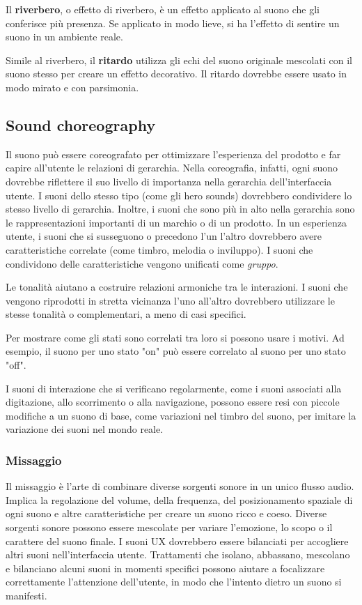 \documentclass[12pt, a4paper]{report}
\begin{document}
                    	Il \textbf{riverbero}, o effetto di riverbero, è un effetto applicato al suono che gli conferisce più presenza. Se applicato in modo lieve, si ha l'effetto di sentire un suono in un ambiente reale.


                    	Simile al riverbero, il \textbf{ritardo} utilizza gli echi del suono originale mescolati con il suono stesso per creare un effetto decorativo. Il ritardo dovrebbe essere usato in modo mirato e con parsimonia.


                \subsection{Sound choreography}
                Il suono può essere coreografato per ottimizzare l'esperienza del prodotto  e far capire all'utente le relazioni  di gerarchia. Nella coreografia, infatti, ogni suono dovrebbe riflettere il suo livello di
                importanza nella gerarchia dell'interfaccia utente. I suoni dello stesso tipo (come gli hero sounds) dovrebbero condividere lo stesso livello di gerarchia. Inoltre, i suoni che sono più in alto nella
                gerarchia sono le rappresentazioni importanti di un marchio o di un prodotto. In un esperienza utente, i suoni che si susseguono o precedono l'un l'altro dovrebbero avere caratteristiche correlate
                (come timbro, melodia o inviluppo). I suoni che condividono delle caratteristiche vengono unificati come \textit{gruppo}.

                Le tonalità aiutano a costruire relazioni armoniche tra le interazioni. I suoni che vengono riprodotti in stretta vicinanza l'uno all'altro dovrebbero utilizzare le stesse tonalità o complementari, a meno di  casi specifici.

                Per mostrare come gli stati sono correlati tra loro si possono usare i motivi. Ad esempio, il suono per uno stato "on" può essere correlato al suono per uno stato "off".

                I suoni di interazione che si verificano regolarmente, come i suoni associati alla digitazione, allo scorrimento o alla navigazione, possono essere resi con piccole modifiche a un suono di base, come variazioni nel timbro del
                suono, per imitare la variazione dei suoni nel mondo reale.

                \subsubsection{Missaggio}
                Il missaggio è l'arte di combinare diverse sorgenti sonore in un unico flusso audio. Implica la regolazione del volume, della frequenza, del posizionamento spaziale di ogni suono e altre caratteristiche per creare un suono ricco e coeso.
                Diverse sorgenti sonore possono essere mescolate per variare l'emozione, lo scopo o il carattere del suono finale. I suoni UX dovrebbero essere bilanciati per accogliere altri suoni nell'interfaccia utente. Trattamenti che isolano, abbassano,
                mescolano e bilanciano alcuni suoni in momenti specifici possono aiutare a focalizzare correttamente l'attenzione dell'utente, in modo che l'intento dietro un suono si manifesti.
\end{document}
